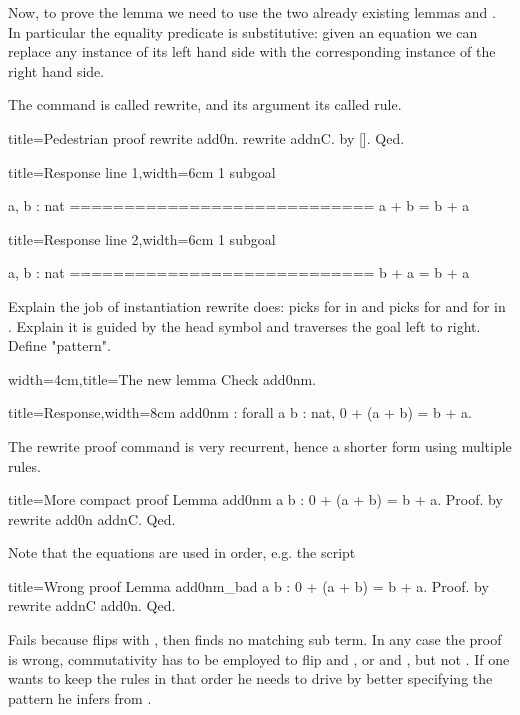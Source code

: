 Now, to prove the lemma we need to use the two already existing
lemmas  and .  In particular the equality predicate
is substitutive: given an equation we can replace any instance of
its left hand side with the corresponding instance of the right hand side.

The command is called rewrite, and its argument its called rule.

\begin{coq}{title=Pedestrian proof}
rewrite add0n.
rewrite addnC.
by [].
Qed.
\end{coq}

\begin{coqout}{title=Response line 1,width=6cm}
1 subgoal

  a, b : nat
  ============================
   a + b = b + a
\end{coqout}
\begin{coqout}{title=Response line 2,width=6cm}
1 subgoal

  a, b : nat
  ============================
   b + a = b + a
\end{coqout}

Explain the job of instantiation rewrite does: picks  for
 in  and picks  for  and  for  in
.  Explain it is guided by the head symbol \C{+} and traverses
the goal left to right.  Define "pattern".

\begin{coq}{width=4cm,title=The new lemma}
Check add0nm.
\end{coq}
\begin{coqout}{title=Response,width=8cm}
add0nm : forall a b : nat, 0 + (a + b) = b + a.
\end{coqout}

The rewrite proof command is very recurrent, hence a shorter form
using multiple rules.

\begin{coq}{title=More compact proof}
Lemma add0nm a b : 0 + (a + b) = b + a.
Proof. by rewrite add0n addnC. Qed.
\end{coq}

Note that the equations are used in order, e.g. the script

\begin{coq}{title=Wrong proof}
Lemma add0nm_bad a b : 0 + (a + b) = b + a.
Proof. by rewrite addnC add0n. Qed.
\end{coq}

Fails because  flips  with , then
 finds no matching sub term.  In any case the proof
is wrong, commutativity has to be employed to flip  and ,
or  and , but not .  If one wants to keep the rules
in that order he needs to drive \Coq{} by better specifying the
pattern he infers from .


